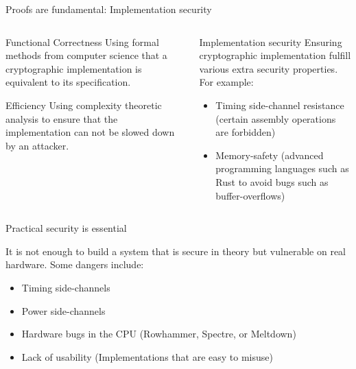 \begin{frame}{Proofs are fundamental: Implementation security}
  \begin{columns}[t,fullwidth]

    \begin{column}{.40\textwidth}
      \begin{block}{Functional Correctness}
        Using formal methods from computer science that a cryptographic implementation is equivalent to its specification.
      \end{block}
      
      \vfill

      \begin{block}{Efficiency}
        Using complexity theoretic analysis to ensure that the implementation can not be slowed down by an attacker.
      \end{block}
    \end{column}

    \begin{column}{.55\textwidth}
      \begin{block}{Implementation security}
        Ensuring cryptographic implementation fulfill various extra security properties.
        For example:
        \vfill
        \begin{itemize}
          \item Timing side-channel resistance (certain assembly operations are forbidden)
          \item Memory-safety (advanced programming languages such as Rust to avoid bugs such as buffer-overflows)
        \end{itemize}
      \end{block}
    \end{column}
  \end{columns}

\end{frame}

\begin{frame}{Practical security is essential}
  \small

  It is not enough to build a system that is secure in theory but vulnerable on real hardware.
  Some dangers include:

  \begin{itemize}
    \item Timing side-channels
    \item Power side-channels
    \item Hardware bugs in the CPU (Rowhammer, Spectre, or Meltdown)
    \item Lack of usability (Implementations that are easy to misuse)
  \end{itemize}
\end{frame}


